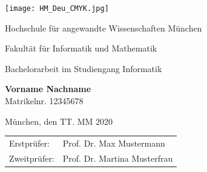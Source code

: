 

\pagestyle{scrheadings}
\chead{\headmark} %
\overfullrule=3pt


\begin{titlepage}
	\centering
	\setlength{\parindent}{0pt}
	
	\singlespacing
	
	\begin{flushright}
		\texttt{[image: HM\_Deu\_CMYK.jpg]}
	\end{flushright}
	
	\vspace*{10mm}
	
	\begin{Huge}
		Hochschule für angewandte Wissenschaften München \\
	\end{Huge}

	\vspace{10mm}

	\begin{Large}
		Fakultät für Informatik und Mathematik \\
	\end{Large}
	
	\vspace{20mm}
	
	{
		\doublespacing
		\large
		\sffamily
		\bfseries
		\begin{Huge}
		\end{Huge}
		\par
	}

	\singlespacing

	\vspace{20mm}
	\normalfont
	Bachelorarbeit im Studiengang Informatik
	
	\vspace{20mm}
	\textsf{\textbf{Vorname Nachname}}\\
	Matrikelnr. 12345678
	
	\vspace{0.5\baselineskip}
	München, den TT. MM 2020
	
	\vfill
	
	\begin{tabular}{@{}ll}
		Erstprüfer: & Prof. Dr. Max Mustermann \\
		Zweitprüfer: & Prof. Dr. Martina Musterfrau \\
	\end{tabular}

\end{titlepage}



